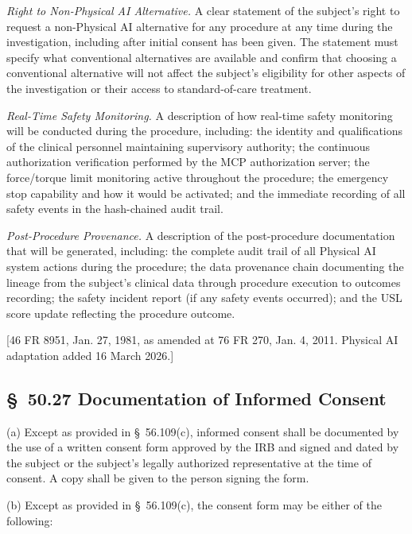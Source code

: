 \documentclass[11pt]{article}
\begin{document}
\begin{description}[leftmargin=1.0cm,style=sameline]
\item[(6)] \textit{Right to Non-Physical AI Alternative.} A clear statement of the subject's right to request a non-Physical AI alternative for any procedure at any time during the investigation, including after initial consent has been given. The statement must specify what conventional alternatives are available and confirm that choosing a conventional alternative will not affect the subject's eligibility for other aspects of the investigation or their access to standard-of-care treatment.

\item[(7)] \textit{Real-Time Safety Monitoring.} A description of how real-time safety monitoring will be conducted during the procedure, including: the identity and qualifications of the clinical personnel maintaining supervisory authority; the continuous authorization verification performed by the MCP authorization server; the force/torque limit monitoring active throughout the procedure; the emergency stop capability and how it would be activated; and the immediate recording of all safety events in the hash-chained audit trail.

\item[(8)] \textit{Post-Procedure Provenance.} A description of the post-procedure documentation that will be generated, including: the complete audit trail of all Physical AI system actions during the procedure; the data provenance chain documenting the lineage from the subject's clinical data through procedure execution to outcomes recording; the safety incident report (if any safety events occurred); and the USL score update reflecting the procedure outcome.
\end{description}

[46 FR 8951, Jan. 27, 1981, as amended at 76 FR 270, Jan. 4, 2011. Physical AI adaptation added 16 March 2026.]

\subsection{\S~50.27 Documentation of Informed Consent}

(a) Except as provided in \S~56.109(c), informed consent shall be documented by the use of a written consent form approved by the IRB and signed and dated by the subject or the subject's legally authorized representative at the time of consent. A copy shall be given to the person signing the form.

(b) Except as provided in \S~56.109(c), the consent form may be either of the following:
\end{document}
